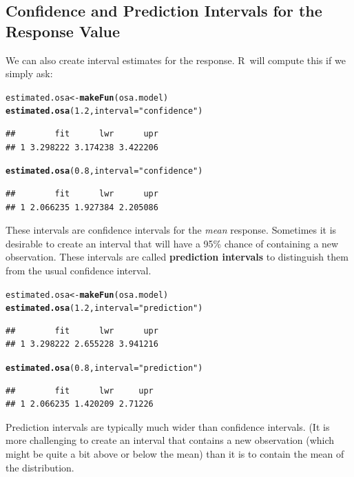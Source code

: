 \documentclass[twoside]{book}\usepackage[]{graphicx}\usepackage[]{xcolor}
\makeatletter
\newcommand{\hlnum}[1]{\textcolor[rgb]{0.686,0.059,0.569}{#1}}%
\newcommand{\hlstr}[1]{\textcolor[rgb]{0.192,0.494,0.8}{#1}}%
\newcommand{\hlstd}[1]{\textcolor[rgb]{0.345,0.345,0.345}{#1}}%
\newcommand{\hlkwb}[1]{\textcolor[rgb]{0.69,0.353,0.396}{#1}}%
\newcommand{\hlkwc}[1]{\textcolor[rgb]{0.333,0.667,0.333}{#1}}%
\newcommand{\hlkwd}[1]{\textcolor[rgb]{0.737,0.353,0.396}{\textbf{#1}}}%
\newenvironment{kframe}{%
 \def\at@end@of@kframe{}%
 \ifinner\ifhmode%
  \def\at@end@of@kframe{\end{minipage}}%
  \begin{minipage}{\columnwidth}%
 \fi\fi%
 \def\FrameCommand##1{\hskip\@totalleftmargin \hskip-\fboxsep
 \colorbox{shadecolor}{##1}\hskip-\fboxsep
     \hskip-\linewidth \hskip-\@totalleftmargin \hskip\columnwidth}%
 \MakeFramed {\advance\hsize-\width
   \@totalleftmargin\z@ \linewidth\hsize
   \@setminipage}}%
 {\par\unskip\endMakeFramed%
 \at@end@of@kframe}
\newenvironment{knitrout}{}{} %
\def\R{{\sf R}}
\def\term#1{\textbf{#1}}
\makeatother
\begin{document}
\subsection{Confidence and Prediction Intervals for the Response Value}
We can also create interval estimates for the response.    \R\ will compute
this if we simply ask:
\begin{knitrout}
\color{fgcolor}\begin{kframe}
\begin{alltt}
\hlstd{estimated.osa} \hlkwb{<-} \hlkwd{makeFun}\hlstd{(osa.model)}
\hlkwd{estimated.osa}\hlstd{(}\hlnum{1.2}\hlstd{,} \hlkwc{interval} \hlstd{=} \hlstr{"confidence"}\hlstd{)}
\end{alltt}
\begin{verbatim}
##        fit      lwr      upr
## 1 3.298222 3.174238 3.422206
\end{verbatim}
\begin{alltt}
\hlkwd{estimated.osa}\hlstd{(}\hlnum{0.8}\hlstd{,} \hlkwc{interval} \hlstd{=} \hlstr{"confidence"}\hlstd{)}
\end{alltt}
\begin{verbatim}
##        fit      lwr      upr
## 1 2.066235 1.927384 2.205086
\end{verbatim}
\end{kframe}
\end{knitrout}
These intervals are confidence intervals for the \emph{mean} response.  Sometimes it
is desirable to create an interval that will have a 95\% chance of containing a new 
observation.  These intervals are called \term{prediction intervals} to distinguish
them from the usual confidence interval.
\begin{knitrout}
\color{fgcolor}\begin{kframe}
\begin{alltt}
\hlstd{estimated.osa} \hlkwb{<-} \hlkwd{makeFun}\hlstd{(osa.model)}
\hlkwd{estimated.osa}\hlstd{(}\hlnum{1.2}\hlstd{,} \hlkwc{interval} \hlstd{=} \hlstr{"prediction"}\hlstd{)}
\end{alltt}
\begin{verbatim}
##        fit      lwr      upr
## 1 3.298222 2.655228 3.941216
\end{verbatim}
\begin{alltt}
\hlkwd{estimated.osa}\hlstd{(}\hlnum{0.8}\hlstd{,} \hlkwc{interval} \hlstd{=} \hlstr{"prediction"}\hlstd{)}
\end{alltt}
\begin{verbatim}
##        fit      lwr     upr
## 1 2.066235 1.420209 2.71226
\end{verbatim}
\end{kframe}
\end{knitrout}
Prediction intervals are typically much wider than confidence intervals.  (It is more challenging
to create an interval that contains a new observation (which might be quite a bit above 
or below the mean) than it is to contain the mean of the distribution.
\end{document}
